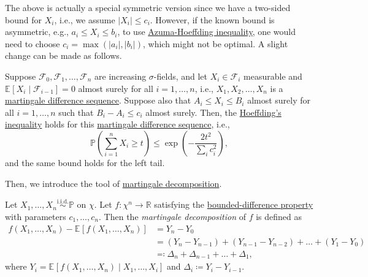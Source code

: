 The above is actually a special symmetric version since we have a two-sided bound for \(X_i\), i.e., we assume \(\vert X_i \vert \leq c_i\). However, if the known bound is asymmetric, e.g., \(a_i \leq X_i \leq b_i\), to use \hyperref[thm:Azuma-Hoeffding-inequality]{Azuma-Hoeffding inequality}, one would need to choose \(c_i = \max (\vert a_i \vert , \vert b_i \vert )\), which might not be optimal. A slight change can be made as follows.

\begin{corollary}\label{col:general-Azuma-Hoeffding-inequality}
	Suppose \(\mathcal{F} _0, \mathcal{F} _1, \dots , \mathcal{F} _n \) are increasing \(\sigma \)-fields, and let \(X_i \in \mathcal{F} _i\) measurable and \(\mathbb{E}_{}\left[X_i \mid \mathcal{F} _{i-1} \right] = 0\) almost surely for all \(i=1, \dots , n\), i.e., \(X_1, X_2, \dots , X_n\) is a \hyperref[def:martingale-difference-sequence]{martingale difference sequence}. Suppose also that \(A_i \leq X_i \leq B_i\) almost surely for all \(i = 1, \dots , n\) such that \(B_i - A_i \leq c_i\) almost surely. Then, the \hyperref[thm:Hoeffding-inequality]{Hoeffding's inequality} holds for this \hyperref[def:martingale-difference-sequence]{martingale difference sequence}, i.e.,
	\[
		\mathbb{P} \left( \sum_{i=1}^{n} X_i \geq t \right) \leq \exp(- \frac{2 t^2}{\sum_{i} c_i^2}),
	\]
	and the same bound holds for the left tail.
\end{corollary}

Then, we introduce the tool of \hyperref[def:martingale-decomposition]{martingale decomposition}.

\begin{definition}\label{def:martingale-decomposition}
	Let \(X_1, \dots , X_n \overset{\text{i.i.d.} }{\sim } \mathbb{P}\) on \(\chi \). Let \(f \colon \chi ^n \to \mathbb{R} \) satisfying the \hyperref[def:bounded-difference-property]{bounded-difference property} with parameters \(c_1, \dots , c_n\). Then the \emph{martingale decomposition} of \(f\) is defined as
	\[
		\begin{split}
			f(X_1, \dots , X_n) - \mathbb{E}_{}\left[f(X_1, \dots , X_n) \right]
			&= Y_n - Y_0 \\
			&= (Y_n - Y_{n-1}) + (Y_{n-1} - Y_{n-2}) + \dots + (Y_1 - Y_0) \\
			&\eqqcolon \Delta _n + \Delta _{n-1} + \dots + \Delta _1,
		\end{split}
	\]
	where \(Y_i = \mathbb{E}_{}\left[f(X_1, \dots , X_n) \mid X_1, \dots , X_i \right] \) and \(\Delta _i \coloneqq Y_i - Y_{i-1}\).
\end{definition}


